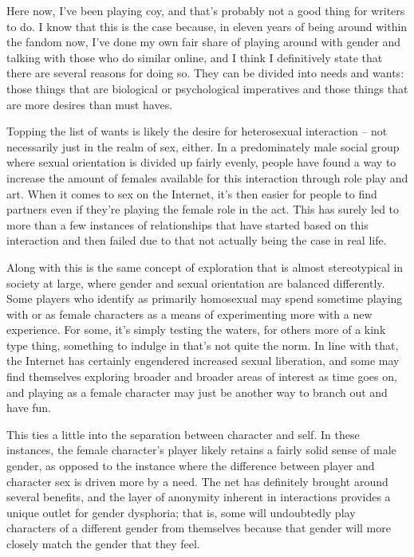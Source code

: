 Here now, I've been playing coy, and that's probably not a good thing for writers to do.  I know that this is the case because, in eleven years of being around within the fandom now, I've done my own fair share of playing around with gender and talking with those who do similar online, and I think I definitively state that there are several reasons for doing so.  They can be divided into needs and wants: those things that are biological or psychological imperatives and those things that are more desires than must haves.

Topping the list of wants is likely the desire for heterosexual interaction -- not necessarily just in the realm of sex, either.  In a predominately male social group where sexual orientation is divided up fairly evenly, people have found a way to increase the amount of females available for this interaction through role play and art.  When it comes to sex on the Internet, it's then easier for people to find partners even if they're playing the female role in the act. This has surely led to more than a few instances of relationships that have started based on this interaction and then failed due to that not actually being the case in real life.

Along with this is the same concept of exploration that is almost stereotypical in society at large, where gender and sexual orientation are balanced differently.  Some players who identify as primarily homosexual may spend sometime playing with or as female characters as a means of experimenting more with a new experience.  For some, it's simply testing the waters, for others more of a kink type thing, something to indulge in that's not quite the norm.  In line with that, the Internet has certainly engendered increased sexual liberation, and some may find themselves exploring broader and broader areas of interest as time goes on, and playing as a female character may just be another way to branch out and have fun.

This ties a little into the separation between character and self.  In these instances, the female character's player likely retains a fairly solid sense of male gender, as opposed to the instance where the difference between player and character sex is driven more by a need. The net has definitely brought around several benefits, and the layer of anonymity inherent in interactions provides a unique outlet for gender dysphoria; that is, some will undoubtedly play characters of a different gender from themselves because that gender will more closely match the gender that they feel.

